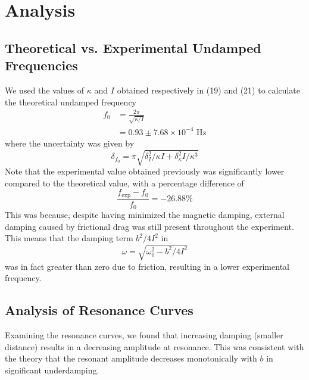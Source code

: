 \section{Analysis}
\subsection{Theoretical vs. Experimental Undamped Frequencies}
We used the values of $\kappa$ and $I$ obtained respectively in (19) and (21) to calculate the theoretical undamped frequency
\begin{equation}
\begin{aligned}
f_0 &= \frac{2\pi}{\sqrt{\kappa/I}}\\
&= 0.93\pm7.68\times10^{-4} \text{ Hz}
\end{aligned}
\end{equation}
where the uncertainty was given by
\begin{equation}
\delta_{f_0} = \pi\sqrt{\delta^2_I/\kappa I+\delta^2_\kappa I/\kappa^3}
\end{equation}
Note that the experimental value obtained previously was significantly lower compared to the theoretical value, with a percentage difference of
\begin{equation}
\frac{f_{\text{exp}} - f_0}{f_0}= -26.88\%
\end{equation}
This was because, despite having minimized the magnetic damping, external damping caused by frictional drag was still present throughout the experiment. This means that the damping term $b^2/4I^2$ in
\begin{equation}
\omega = \sqrt{\omega_0^2-b^2/4I^2}
\end{equation}
was in fact greater than zero due to friction, resulting in a lower experimental frequency. 

\subsection{Analysis of Resonance Curves}
Examining the resonance curves, we found that increasing damping (smaller distance) results in a decreasing amplitude at resonance. This was consistent with the theory that the resonant amplitude decreases monotonically with $b$ in significant underdamping.


